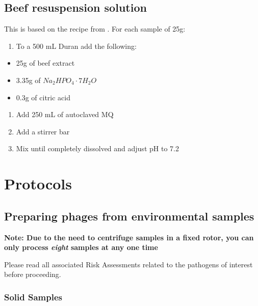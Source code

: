\documentclass[
]{book}
\providecommand{\tightlist}{%
  \setlength{\itemsep}{0pt}\setlength{\parskip}{0pt}}
\begin{document}
\hypertarget{beef-resuspension-solution}{%
\section{Beef resuspension solution}\label{beef-resuspension-solution}}

This is based on the recipe from \citep{Williamson2003-fu}. For each sample of 25g:

\begin{enumerate}
\def\labelenumi{\arabic{enumi}.}
\tightlist
\item
  To a 500 mL Duran add the following:
\end{enumerate}

\begin{itemize}
\tightlist
\item
  25g of beef extract
\item
  3.35g of \(Na_{2}HPO_{4}\cdot7H_{2}O\)
\item
  0.3g of citric acid
\end{itemize}

\begin{enumerate}
\def\labelenumi{\arabic{enumi}.}
\setcounter{enumi}{1}
\tightlist
\item
  Add 250 mL of autoclaved MQ
\item
  Add a stirrer bar
\item
  Mix until completely dissolved and adjust pH to 7.2
\end{enumerate}

\hypertarget{protocols}{%
\chapter*{Protocols}\label{protocols}}

\hypertarget{preparing-phages-from-environmental-samples}{%
\section{Preparing phages from environmental samples}\label{preparing-phages-from-environmental-samples}}

\textbf{Note: Due to the need to centrifuge samples in a fixed rotor, you can only process \emph{eight} samples at any one time}

Please read all associated Risk Assessments related to the pathogens of interest before proceeding.

\hypertarget{solid-samples}{%
\subsection{Solid Samples}\label{solid-samples}}
\end{document}
